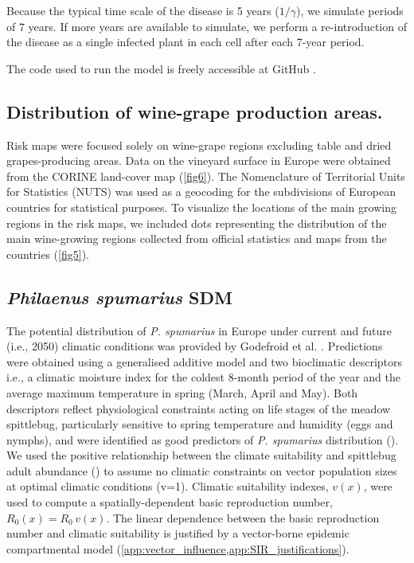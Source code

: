 Because the typical time scale of the disease is 5 years ($1/\gamma$), we
simulate periods of 7 years. If more years are available
to simulate, we perform a re-introduction of the disease as a single infected
plant in each cell after each 7-year period.

The code used to run the model is freely accessible at GitHub
\cite{CODE_model}.

\subsection{Distribution of wine-grape production areas.} Risk maps were
focused solely on wine-grape regions excluding table and dried
grapes-producing
areas. Data on the vineyard surface in Europe were obtained from the CORINE
land-cover map \cite{Corine} (\cref{fig6}). The Nomenclature of Territorial
Units for Statistics (NUTS) was used as a geocoding for the subdivisions of
European countries for statistical purposes. To visualize the locations of
the
main growing regions in the risk maps, we included dots representing the
distribution of the main wine-growing regions collected from official
statistics and maps from the countries (\cref{fig5}).

\subsection{\textit{Philaenus spumarius} SDM}

The potential distribution of \textit{P. spumarius} in Europe under current and
future (i.e., 2050) climatic conditions was provided by Godefroid et al.
\cite{Godefroid2021}. Predictions were obtained using a generalised additive
model and two bioclimatic descriptors i.e., a climatic moisture index for the
coldest 8-month period of the year and the average maximum temperature in
spring (March, April and May). Both descriptors reflect physiological
constraints acting on life stages of the meadow spittlebug, particularly
sensitive to spring temperature and humidity (eggs and nymphs), and were
identified as good predictors of \textit{P. spumarius} distribution
(\cite{Godefroid2021}). We used the positive relationship between the climate
suitability and spittlebug adult abundance (\cite{Godefroid2021}) to assume no
climatic constraints on vector population sizes at optimal climatic conditions
(v=1). Climatic suitability indexes, $v(x)$, were used to compute a
spatially-dependent basic reproduction number, $R_0(x)=R_0\, v(x)$. The linear
dependence between the basic reproduction number and climatic suitability is
justified by a vector-borne epidemic compartmental model
(\cref{app:vector_influence,app:SIR_justifications}).

